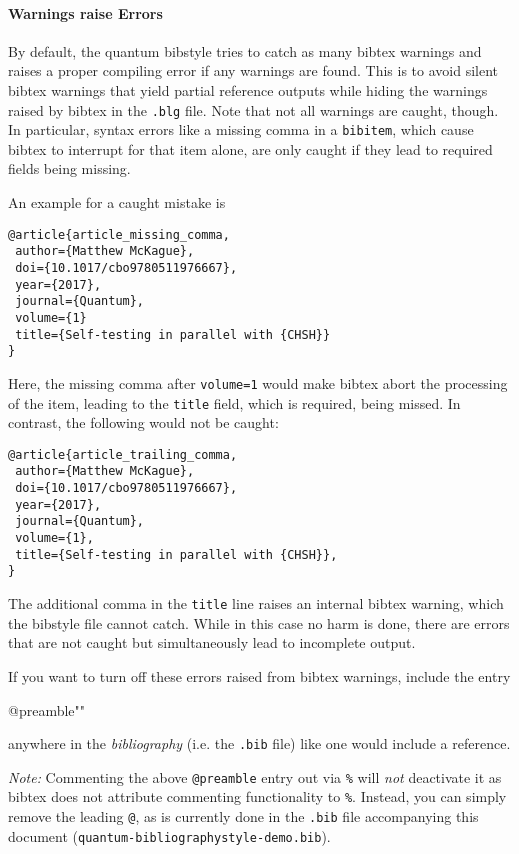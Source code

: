 \documentclass[a4paper,twocolumn,11pt]{quantumarticle}
\begin{document}
\paragraph{Warnings raise Errors}
By default, the quantum bibstyle tries to catch as many bibtex warnings and raises a proper compiling error if any warnings are found. This is to avoid silent bibtex warnings that yield partial reference outputs while hiding the warnings raised by bibtex in the \texttt{.blg} file.
Note that not all warnings are caught, though. In particular, syntax errors like a missing comma in a \texttt{bibitem}, which cause bibtex to interrupt for that item alone, are only caught if they lead to required fields being missing.

An example for a caught mistake is
{\small
\begin{verbatim}
@article{article_missing_comma,
 author={Matthew McKague},
 doi={10.1017/cbo9780511976667},
 year={2017},
 journal={Quantum},
 volume={1}
 title={Self-testing in parallel with {CHSH}}
}
\end{verbatim}
}
Here, the missing comma after \texttt{volume={1}} would make bibtex abort the processing of the item, leading
to the \texttt{title} field, which is required, being missed.
In contrast, the following would not be caught:
{\small
\begin{verbatim}
@article{article_trailing_comma,
 author={Matthew McKague},
 doi={10.1017/cbo9780511976667},
 year={2017},
 journal={Quantum},
 volume={1},
 title={Self-testing in parallel with {CHSH}},
}
\end{verbatim}
}
The additional comma in the \texttt{title} line raises an internal bibtex warning, which the bibstyle file cannot catch. While in this case no harm is done, there are errors that are not caught but simultaneously lead to incomplete output.

If you want to turn off these errors raised from bibtex warnings, include the entry
\begin{verbatim*}
@preamble{"\DoNotMakeWarningsErrors"}
\end{verbatim*}
anywhere in the \emph{bibliography} (i.e. the \texttt{.bib} file) like one would include a reference.

\emph{Note:} Commenting the above \texttt{@preamble} entry out via \texttt{\%} will \emph{not} deactivate it as bibtex does not attribute commenting functionality to \texttt{\%}. Instead, you can simply remove the leading \texttt{@}, as is currently done in the \texttt{.bib} file accompanying this document (\texttt{quantum-bibliographystyle-demo.bib}).
\end{document}
